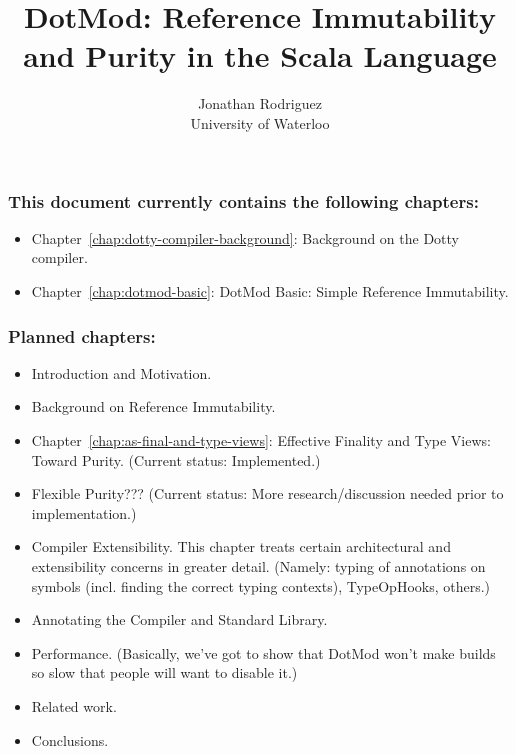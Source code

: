 \documentclass[11pt]{report}
\begin{document}
\title{DotMod: Reference Immutability and Purity in the Scala Language}
\author{Jonathan Rodriguez\\University of Waterloo}
\maketitle


\subsubsection{This document currently contains the following chapters:}
\begin{itemize}
\item Chapter~\ref{chap:dotty-compiler-background}: Background on the Dotty compiler.
\item Chapter~\ref{chap:dotmod-basic}: DotMod Basic: Simple Reference Immutability.
\end{itemize}

\subsubsection{Planned chapters:}
\begin{itemize}
\item Introduction and Motivation.
\item Background on Reference Immutability.
\item Chapter~\ref{chap:as-final-and-type-views}: Effective Finality and Type Views: Toward Purity. (Current status: Implemented.)
\item Flexible Purity??? (Current status: More research/discussion needed prior to implementation.)
\item Compiler Extensibility. This chapter treats certain architectural and extensibility concerns in greater detail. (Namely: typing of annotations on symbols (incl. finding the correct typing contexts), TypeOpHooks, others.)
\item Annotating the Compiler and Standard Library.
\item Performance. (Basically, we've got to show that DotMod won't make builds so slow that people will want to disable it.)
\item Related work.
\item Conclusions.
\end{itemize}
\end{document}
